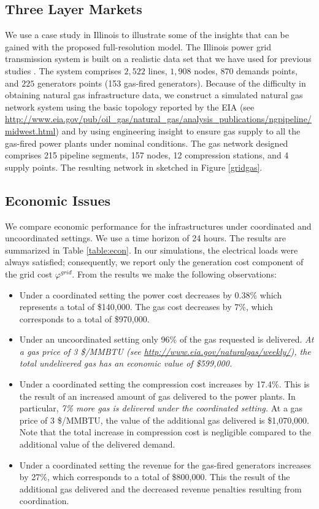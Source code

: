 \documentclass[11pt,twoside]{article}
\begin{document}
\subsection{Three Layer Markets}
We use a case study in Illinois to illustrate some of the insights that can be gained with the proposed full-resolution model. The Illinois power grid transmission system  is built on a realistic data set that we have used for previous studies \cite{zavaladispatch}. The system comprises $2{,}522$ lines, $1{,}908$ nodes, $870$ demands points, and $225$ generators points (153 gas-fired generators). Because of the difficulty in obtaining natural gas infrastructure data, we construct a simulated natural gas network system using the basic topology reported by the EIA (see \url{http://www.eia.gov/pub/oil_gas/natural_gas/analysis_publications/ngpipeline/midwest.html}) and by using engineering insight to ensure gas supply to all the gas-fired power plants under nominal conditions. The gas network designed comprises 215 pipeline segments, 157 nodes, 12 compression stations, and 4 supply points. The resulting network in sketched in Figure \ref{gridgas}. 


\subsection{Economic Issues}

We compare economic performance for the infrastructures under coordinated and uncoordinated settings.  We use a time horizon of 24 hours. The results are summarized in Table \ref{table:econ}. In our simulations, the electrical loads were always satisfied; consequently, we report only the generation cost component of the grid cost $\varphi^{grid}$. From the results we make the following observations:
\begin{itemize}
\item Under a coordinated setting the power cost decreases by 0.38\% which represents a total of \$140,000. The gas cost decreases by 7\%, which corresponds to a total of  \$970,000.  
\item Under an uncoordinated setting only 96\% of the gas requested is delivered. {\em At a gas price of 3 \$/MMBTU (see \url{http://www.eia.gov/naturalgas/weekly/}), the total undelivered gas has an economic value of \$599,000.}  
\item Under a coordinated setting the compression cost increases by 17.4\%. This is the result of an increased amount of gas delivered to the power plants. In particular, {\em 7\% more gas is delivered under the coordinated setting.}  At a gas price of 3 \$/MMBTU, the value of the additional gas delivered is \$1,070,000.  Note that the total increase in compression cost is negligible compared to the additional value of the delivered demand.  
\item Under a coordinated setting the revenue for the gas-fired generators increases by  27\%, which corresponds to a total of \$800,000. This the   result of the additional gas delivered and the decreased revenue penalties resulting from coordination. 
\end{itemize}
\end{document}
